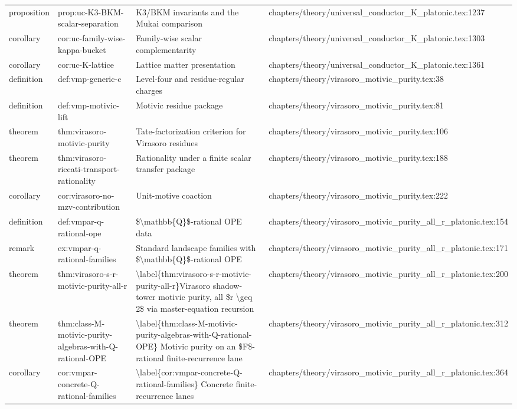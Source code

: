 \documentclass[11pt]{article}
\begin{document}
\begin{longtable}{L{0.10\textwidth}L{0.26\textwidth}L{0.42\textwidth}L{0.22\textwidth}}
proposition & prop:uc-K3-BKM-scalar-separation & K3/BKM invariants and the Mukai comparison & chapters/theory/universal\_conductor\_K\_platonic.tex:1237\\
corollary & cor:uc-family-wise-kappa-bucket & Family-wise scalar complementarity & chapters/theory/universal\_conductor\_K\_platonic.tex:1303\\
corollary & cor:uc-K-lattice & Lattice matter presentation & chapters/theory/universal\_conductor\_K\_platonic.tex:1361\\
definition & def:vmp-generic-c & Level-four and residue-regular charges & chapters/theory/virasoro\_motivic\_purity.tex:38\\
definition & def:vmp-motivic-lift & Motivic residue package & chapters/theory/virasoro\_motivic\_purity.tex:81\\
theorem & thm:virasoro-motivic-purity & Tate-factorization criterion for Virasoro residues & chapters/theory/virasoro\_motivic\_purity.tex:106\\
theorem & thm:virasoro-riccati-transport-rationality & Rationality under a finite scalar transfer package & chapters/theory/virasoro\_motivic\_purity.tex:188\\
corollary & cor:virasoro-no-mzv-contribution & Unit-motive coaction & chapters/theory/virasoro\_motivic\_purity.tex:222\\
definition & def:vmpar-q-rational-ope & \$\textbackslash{}mathbb\{Q\}\$-rational OPE data & chapters/theory/virasoro\_motivic\_purity\_all\_r\_platonic.tex:154\\
remark & ex:vmpar-q-rational-families & Standard landscape families with \$\textbackslash{}mathbb\{Q\}\$-rational OPE & chapters/theory/virasoro\_motivic\_purity\_all\_r\_platonic.tex:171\\
theorem & thm:virasoro-s-r-motivic-purity-all-r & \textbackslash{}label\{thm:virasoro-s-r-motivic-purity-all-r\}Virasoro shadow-tower motivic purity, all \$r \textbackslash{}geq 2\$ via master-equation recursion & chapters/theory/virasoro\_motivic\_purity\_all\_r\_platonic.tex:200\\
theorem & thm:class-M-motivic-purity-algebras-with-Q-rational-OPE & \textbackslash{}label\{thm:class-M-motivic-purity-algebras-with-Q-rational-OPE\} Motivic purity on an \$F\$-rational finite-recurrence lane & chapters/theory/virasoro\_motivic\_purity\_all\_r\_platonic.tex:312\\
corollary & cor:vmpar-concrete-Q-rational-families & \textbackslash{}label\{cor:vmpar-concrete-Q-rational-families\} Concrete finite-recurrence lanes & chapters/theory/virasoro\_motivic\_purity\_all\_r\_platonic.tex:364\\

\end{longtable}
\end{document}
